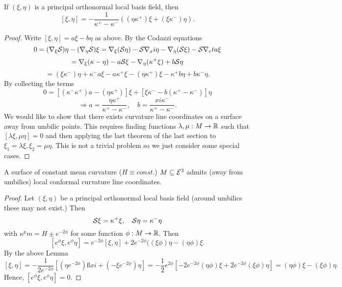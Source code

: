 \begin{lemma}
	
	If $ (\xi,\eta) $ is a principal orthonormal local basis field, then
		\[ [\xi,\eta] = - \dfrac{1}{\kappa^+ - \kappa^-}((\eta\kappa^+)\xi + (\xi\kappa^-)\eta). \]
	
\end{lemma}

\begin{proof}
	
	Write $ [\xi,\eta] = a\xi - b\eta $ as above. By the Codazzi equations
		\[ 0 = (\nabla_\xi \mathcal S)\eta - (\nabla_\eta \mathcal S) \xi = \nabla_\xi(\mathcal S\eta) - \mathcal S\nabla_xi \eta - \nabla_\eta(\mathcal S\xi) - \mathcal S\nabla_eta \xi  \]
		\[ = \nabla_\xi(\kappa- \eta) - a \mathcal S \xi - \nabla_\eta(\kappa^+\xi) + b\mathcal S\eta \]
		\[ = (\xi\kappa^-) \eta + \kappa^-a\xi -a\kappa^+\xi - (\eta\kappa^+)\xi - \kappa^+b\eta + b \kappa^-\eta. \]
	By collecting the terms
		\[ 0 = [ (\kappa^- \kappa^+)a - (\eta\kappa^+) ]\xi + [ \xi \kappa^- - b(\kappa^+ - \kappa^-) ] \eta \]
		\[ \Rightarrow a = \dfrac{\eta \kappa^+}{\kappa^+ - \kappa^-}, \quad b= \dfrac{xi \kappa^-}{\kappa^+ - \kappa^-}. \]
	We would like to show that there exists curvature line coordinates on a surface away from umbilic points. This requires finding functions $ \lambda,\mu: M \rightarrow \mathbb R $ such that $ [ \lambda\xi,\mu\eta ] = 0 $ and  then applying the last theorem of the last section to $ \xi_1 = \lambda\xi, \xi_2 = \mu \eta $. This is not a trivial problem so we just consider some special cases.
	
			
\end{proof}

\begin{corollary}
	A surface of constant mean curvature ($ H \equiv const. $) $ M \subseteq \mathcal E^3 $ admits (away from umbilics) local conformal curvature line coordinates.
\end{corollary}

\begin{proof}
	
	Let $ (\xi,\eta) $ be a principal orthonormal local basis field (around umbilics these  may not exist.) Then 
		\[ \mathcal S \xi = \kappa^+\xi, \quad \mathcal S \eta = \kappa^-\eta \]
		with $ \kappa^pm = H \pm e^{-2 \phi} $ for some function $ \phi: M \rightarrow \mathbb R $.
	Then 
		\[ [ e^\phi \xi, e^\phi \eta ] =  e^{-2\phi}[\xi,\eta] + 2e^{-2\phi}((\xi \phi)\eta - (\eta\phi)\xi. \]
	By the above Lemma
		\[ [\xi,\eta] = - \dfrac{1}{2e^{-2\phi}}[(\eta e^{-2\phi})ßxi + (-\xi e^{-2\phi})\eta] = - \dfrac{1}{2} e^{2\phi}[ -2e^{-2\phi}(\eta \phi)\xi + 2e^{-2\phi}(\xi \phi) \eta ] = (\eta \phi)\xi - (\xi \phi)\eta. \]
	Hence, $ [ e^\phi \xi , e^\phi \eta ] = 0 $.	
	
\end{proof}